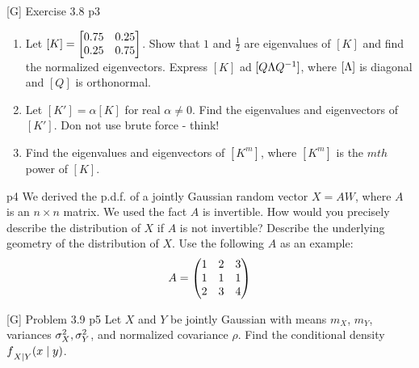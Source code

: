 \documentclass[a4paper, 11pt]{article}
\begin{document}

\begin{problem}{%
[G] Exercise 3.8
}{p3%
	}
\begin{enumerate}[label=(\alph*)]
	\item Let $[K]=\left[\begin{matrix}0.75 & 0.25\\ 0.25 & 0.75\end{matrix}\right]$. Show that $1$ and $\frac12$ are eigenvalues of $[K]$ and find the normalized eigenvectors. Express $[K]$ ad $[Q\Lambda Q^{-1}]$, where $[\Lambda]$ is diagonal and $[Q]$ is orthonormal.
	\item Let $[K']=\alpha[K]$ for real $\alpha\neq 0$. Find the eigenvalues and eigenvectors of $[K']$. Don not use brute force - think!
	\item Find the eigenvalues and eigenvectors of $[K^m]$, where $[K^m]$ is the $mth$ power of $[K]$.
\end{enumerate}
\end{problem}
\solve{
}


\begin{problem}{%
	}{p4%
	}
We derived the p.d.f. of a jointly Gaussian random vector $X=AW$, where $A$ is an $n\times n$ matrix. We used the fact $A$ is invertible. How would you precisely describe the distribution of $X$ if $A$ is not invertible? Describe the underlying geometry of the distribution of $X$. Use the following $A$ as an example: $$A=\left(\begin{matrix}1 & 2 &3\\ 1 & 1&1\\ 2&3&4\end{matrix}\right)$$
\end{problem}
\solve{
}

\begin{problem}{%
		[G] Problem 3.9
	}{p5%
	}
Let $X$ and $Y$ be jointly Gaussian with means $m_X$, $m_Y$, variances $\sigma_X^2, \sigma_Y^2$, and normalized covariance $\rho$. Find the conditional density $f\strut_{X\mid Y}(x\mid y)$.
\end{problem}
\solve{
}
\end{document}
